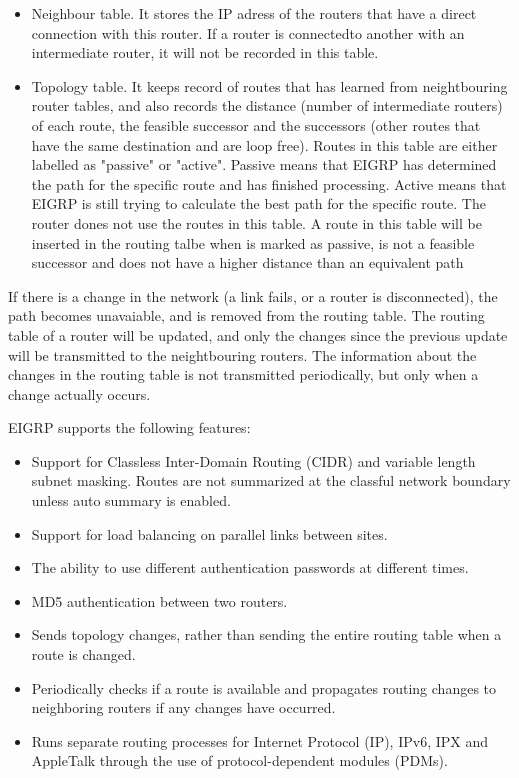 \begin{itemize}
\item Neighbour table. It stores the IP adress of the routers that have a direct connection with this router. If a router is connectedto another with an intermediate router, it will not be recorded in this table.
\item Topology table. It keeps record of routes that has learned from neightbouring router tables, and also records the distance (number of intermediate routers) of each route, the feasible successor and the successors (other routes that have the same destination and are loop free). Routes in this table are either labelled as "passive" or "active". Passive means that EIGRP  has determined the path for the specific route and has finished processing. Active means that EIGRP is still trying to calculate the best path for the specific route. The router dones not use the routes in this table. A route in this table will be inserted in the routing talbe when is marked as passive, is not a feasible successor and does not have a higher distance than an equivalent path
\end{itemize}

If there is a change in the network (a link fails, or a router is disconnected), the path becomes unavaiable, and is removed from the routing table. The routing table of a router will be updated, and only the changes since the previous update will be transmitted to the neightbouring routers. The information about the changes in the routing table is not transmitted periodically, but only when a change actually occurs.

EIGRP supports the following features:

\begin{itemize}
\item Support for Classless Inter-Domain Routing (CIDR) and variable length subnet masking. Routes are not summarized at the classful network boundary unless auto summary is enabled.
\item Support for load balancing on parallel links between sites.
\item The ability to use different authentication passwords at different times.
\item MD5 authentication between two routers.
\item Sends topology changes, rather than sending the entire routing table when a route is changed.
\item Periodically checks if a route is available and propagates routing changes to neighboring routers if any changes have occurred.
\item Runs separate routing processes for Internet Protocol (IP), IPv6, IPX and AppleTalk through the use of protocol-dependent modules (PDMs).
\end{itemize}

